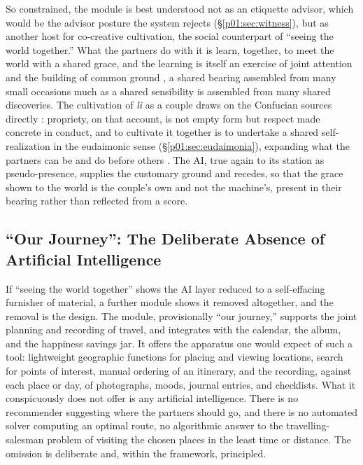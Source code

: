 \documentclass[11pt,a4paper]{article}
\begin{document}
So constrained, the module is best understood not as an etiquette advisor, which would be the advisor posture the system rejects (§\ref{p01:sec:witness}), but as another host for co-creative cultivation, the social counterpart of ``seeing the world together.'' What the partners do with it is learn, together, to meet the world with a shared grace, and the learning is itself an exercise of joint attention and the building of common ground \parencite{tomasello2005intentions, clark1996using}, a shared bearing assembled from many small occasions much as a shared sensibility is assembled from many shared discoveries. The cultivation of \emph{li} as a couple draws on the Confucian sources directly \parencite{ames2011confucian, tu1985confucian}: propriety, on that account, is not empty form but respect made concrete in conduct, and to cultivate it together is to undertake a shared self-realization in the eudaimonic sense (§\ref{p01:sec:eudaimonia}), expanding what the partners can be and do before others \parencite{aron1986love, aron2000couples}. The AI, true again to its station as pseudo-presence, supplies the customary ground and recedes, so that the grace shown to the world is the couple's own and not the machine's, present in their bearing rather than reflected from a score.

\subsection{``Our Journey'': The Deliberate Absence of Artificial Intelligence}\label{p01:sec:ourjourney}

If ``seeing the world together'' shows the AI layer reduced to a self-effacing furnisher of material, a further module shows it removed altogether, and the removal is the design. The module, provisionally ``our journey,'' supports the joint planning and recording of travel, and integrates with the calendar, the album, and the happiness savings jar. It offers the apparatus one would expect of such a tool: lightweight geographic functions for placing and viewing locations, search for points of interest, manual ordering of an itinerary, and the recording, against each place or day, of photographs, moods, journal entries, and checklists. What it conspicuously does not offer is any artificial intelligence. There is no recommender suggesting where the partners should go, and there is no automated solver computing an optimal route, no algorithmic answer to the travelling-salesman problem of visiting the chosen places in the least time or distance. The omission is deliberate and, within the framework, principled.
\end{document}
